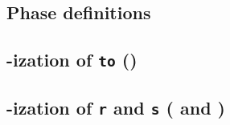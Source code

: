 \subsection{Phase definitions}              \label{rlptxn: phase definitions}                 
\subsection{\rlp{}-ization of \texttt{to} (\phaseTo)}                                             
\subsection{\rlp{}-ization of \texttt{r} and \texttt{s} (\phaseR{} and \phaseS)}              
